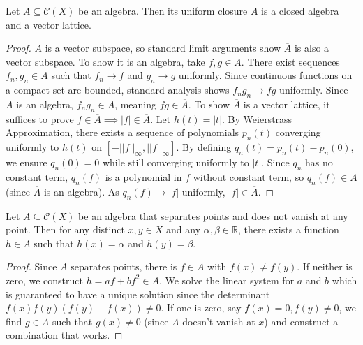 \begin{lemma}
Let $A \subseteq \mathcal{C}(X)$ be an algebra. Then its uniform closure $\overline{A}$ is a closed algebra and a vector lattice.
\end{lemma}
\begin{proof}
$A$ is a vector subspace, so standard limit arguments show $\overline{A}$ is also a vector subspace. To show it is an algebra, take $f, g \in \overline{A}$. There exist sequences $f_n, g_n \in A$ such that $f_n \rightarrow f$ and $g_n \rightarrow g$ uniformly. Since continuous functions on a compact set are bounded, standard analysis shows $f_n g_n \rightarrow fg$ uniformly. Since $A$ is an algebra, $f_n g_n \in A$, meaning $fg \in \overline{A}$.
To show $\overline{A}$ is a vector lattice, it suffices to prove $f \in \overline{A} \implies |f| \in \overline{A}$. Let $h(t) = |t|$. By Weierstrass Approximation, there exists a sequence of polynomials $p_n(t)$ converging uniformly to $h(t)$ on $[-||f||_\infty, ||f||_\infty]$. By defining $q_n(t) = p_n(t) - p_n(0)$, we ensure $q_n(0) = 0$ while still converging uniformly to $|t|$. Since $q_n$ has no constant term, $q_n(f)$ is a polynomial in $f$ without constant term, so $q_n(f) \in \overline{A}$ (since $\overline{A}$ is an algebra). As $q_n(f) \rightarrow |f|$ uniformly, $|f| \in \overline{A}$.
\end{proof}

\begin{lemma}
Let $A \subseteq \mathcal{C}(X)$ be an algebra that separates points and does not vanish at any point. Then for any distinct $x, y \in X$ and any $\alpha, \beta \in \mathbb{R}$, there exists a function $h \in A$ such that $h(x) = \alpha$ and $h(y) = \beta$.
\end{lemma}
\begin{proof}
Since $A$ separates points, there is $f \in A$ with $f(x) \ne f(y)$. If neither is zero, we construct $h = af + bf^2 \in A$. We solve the linear system for $a$ and $b$ which is guaranteed to have a unique solution since the determinant $f(x)f(y)(f(y)-f(x)) \ne 0$. If one is zero, say $f(x)=0, f(y) \ne 0$, we find $g \in A$ such that $g(x) \ne 0$ (since $A$ doesn't vanish at $x$) and construct a combination that works.
\end{proof}

